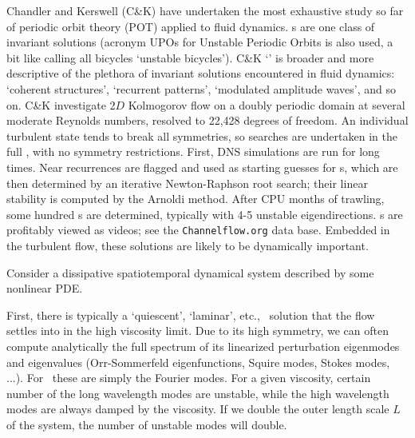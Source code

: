 Chandler and Kerswell (C\&K) have undertaken the most exhaustive
study so far of periodic orbit theory (POT) applied to fluid
dynamics.
\Po s are one class of invariant solutions (acronym UPOs for
Unstable Periodic Orbits is also used, a bit like calling all
bicycles `unstable bicycles'). C\&K `\recFlow' is broader and more
descriptive of the plethora of invariant solutions encountered in
fluid dynamics: `coherent structures', `recurrent patterns',
`modulated amplitude waves', and so on. C\&K investigate
2$D$ Kolmogorov flow on a doubly periodic domain at several
moderate Reynolds numbers, resolved to 22,428 degrees of freedom. An
individual turbulent state tends to break all symmetries, so searches
are undertaken in the full \statesp, with no symmetry restrictions.
First, DNS simulations are run
for long times. Near recurrences are flagged and used as
starting guesses for \recFlow s,  which are then determined by an
iterative Newton-Raphson root search; their linear stability is
computed by the Arnoldi method. After CPU months of trawling, some
hundred \recFlow s are determined, typically with 4-5 unstable
eigen\-directions. \RecFlow s are
profitably viewed as videos; see the \texttt{Channelflow.org}
 {data
base}. Embedded in the turbulent flow, these solutions are likely to
be dynamically important.

Consider a dissipative spatiotemporal dynamical system described by some
nonlinear PDE.

First, there is typically a `quiescent', `laminar', etc., \eqv\
solution that the flow settles into in the high viscosity limit. Due to its
high symmetry, we can often compute analytically the full spectrum of its
linearized perturbation eigenmodes and eigenvalues
(Orr-Sommerfeld eigenfunctions, Squire modes, Stokes modes, ...).
For \KS\ these
are simply the Fourier modes. For a given viscosity, certain number of the
long wavelength modes are unstable, while the high wavelength modes
are always damped by the viscosity. If we double the outer length scale $L$
of the system, the number of unstable modes will double.

